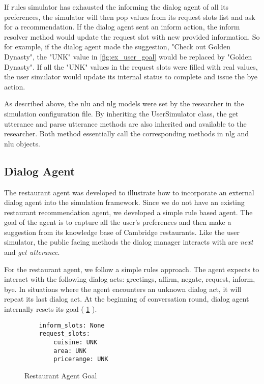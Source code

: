 If rules simulator has exhausted the informing the dialog agent of all its preferences, the simulator will then pop values from its request slots list and ask for a recommendation. If the dialog agent sent an inform action, the inform resolver method would update the request slot with new provided information. So for example, if the dialog agent made the suggestion, "Check out Golden Dynasty", the "UNK" value in \ref{fig:ex_user_goal} would be replaced by "Golden Dynasty". If all the "UNK" values in the request slots were filled with real values, the user simulator would update its internal status to complete and issue the bye action. 

As described above, the nlu and nlg models were set by the researcher in the simulation configuration file. By inheriting the UserSimulator class, the get utterance and parse utterance methods are also inherited and available to the researcher. Both method essentially call the corresponding methods in nlg and nlu objects. 

\subsection{Dialog Agent}

The restaurant agent was developed to illustrate how to incorporate an external dialog agent into the simulation framework. Since we do not have an existing restaurant recommendation agent, we developed a simple rule based agent. The goal of the agent is to capture all the user's preferences and then make a suggestion from its knowledge base of Cambridge restaurants. Like the user simulator, the public facing methods the dialog manager interacts with are \textit{next} and \textit{get utterance}. 

For the restaurant agent, we follow a simple rules approach. The agent expects to interact with the following dialog acts: greetings, affirm, negate, request, inform, bye. In situations where the agent encounters an unknown dialog act, it will repeat its last dialog act. At the beginning of conversation round, dialog agent internally resets its goal ( \ref{fig:ex_res_agent_goal} ). 

  \begin{figure}[h!]
 	\caption{ Restaurant Agent Goal }
 	\label{fig:ex_res_agent_goal}
 	\begin{lstlisting}
 	inform_slots: None
 	request_slots:
 		cuisine: UNK
 		area: UNK
 		pricerange: UNK 	
 	\end{lstlisting}
 \end{figure}

